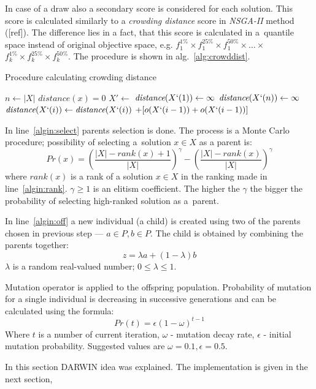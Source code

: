 In case of a draw also a secondary score is considered for each solution. This
score is calculated similarly to a \textit{crowding distance} score in
\textit{NSGA-II} method ([ref]). The difference lies in a fact, that this
score is calculated in a~quantile space instead of original objective space,
e.g. $f^{1\%}_1 \times f^{25\%}_1 \times f^{50\%}_1 \times \dots \times $
$f^{1\%}_k \times f^{25\%}_k \times f^{50\%}_k$. The procedure is shown in
alg.~\ref{alg:crowddist}.

\begin{algorithm}
  \caption{Procedure calculating crowding distance}\label{alg:crowddist}
  \begin{algorithmic}[1]
    \State $n \gets |X|$ 
     
    \State $\textit{distance}(x) = 0$
    \EndFor
    \State $X' \gets$  
    \State $\textit{distance}(X`(1)) \gets \infty$ 
    \State $\textit{distance}(X`(n)) \gets \infty$ 
    \EndFor
     
    \State $\textit{distance}(X`(i)) \gets \textit{distance}(X`(i))$
    $+ [o(X`(i-1)) + o(X`(i-1))]$
    \EndFor
    \EndProcedure{}
  \end{algorithmic}
\end{algorithm}

In line~\ref{algin:select} parents selection is done. The process is a Monte
Carlo procedure; possibility of selecting a~solution $x \in X$ as a parent
is:\\
$$Pr(x) = \left( \frac{|X|-\textit{rank}(x) + 1}{|X|} \right)^\gamma - \left( \frac{|X|-\textit{rank}(x)}{|X|} \right)^\gamma$$
where $\textit{rank}(x)$ is a rank of a solution $x \in X$ in the ranking made
in line~\ref{algin:rank}. $\gamma \geq 1$ is an elitism coefficient. The higher
the $\gamma$ the bigger the probability of selecting high-ranked solution as
a~parent.

In line~\ref{algin:off} a new individual (a child) is created using two of the
parents chosen in previous step --- $a \in P, b \in P$. The child is obtained
by combining the parents together: $$z = \lambda a + (1 - \lambda) b$$
$\lambda$ is a random real-valued number; $0 \leq \lambda \leq 1$.


Mutation operator is applied to the offspring population. Probability of
mutation for a single individual is decreasing in successive generations and
can be calculated using the formula: $$Pr(t) = \epsilon (1 - \omega)^{t-1}$$
Where $t$ is a number of current iteration, $\omega$ - mutation decay rate,
$\epsilon$ - initial mutation probability. Suggested values are
$\omega = 0.1, \epsilon = 0.5$.

In this section DARWIN idea was explained. The implementation is given in the
next section,
